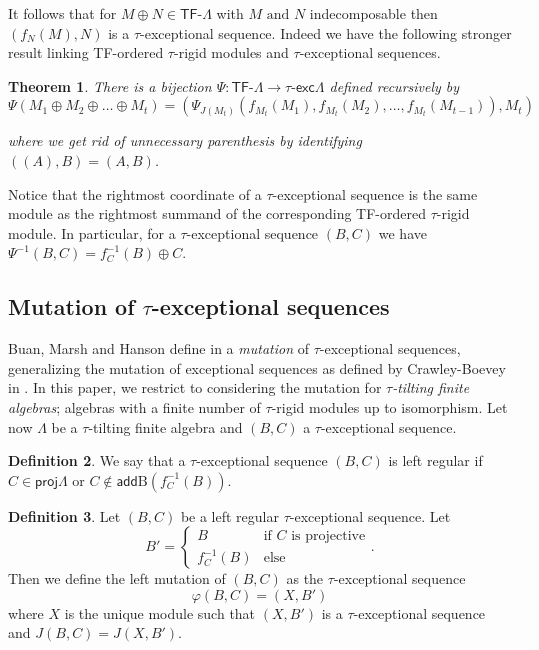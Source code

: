 \documentclass[11pt]{amsart}
\newcommand{\add}{\mathsf{add}}
\newcommand{\proj}{\mathsf{proj}}
\newcommand{\bcomp}{\mathrm{B}}
\newcommand{\tauexc}[1]{\ensuremath{\tau\text{-}\mathsf{exc} #1}}
\newcommand{\tfo}[1]{\ensuremath{\mathsf{TF}\text{-} #1}}
\newtheorem{theorem}{Theorem}[section]
\theoremstyle{definition}
\newtheorem{definition}[theorem]{Definition}
\begin{document}
It follows that for $M \oplus N \in \tfo{\Lambda}$ with $M \text{ and }N$ indecomposable then $(f_N(M),N)$ is a $\tau$-exceptional sequence. Indeed we have the following stronger result linking TF-ordered $\tau$-rigid modules and $\tau$-exceptional sequences.

\begin{theorem}\cite[Thm. 5.1]{mendozatreffinger_stratifyingsystems}\cite[Thm. 5.4]{tauexceptional_buanmarsh}\label{thm:MendozaTreffinger}
    There is a bijection $\Psi\colon \tfo{\Lambda} \to \tauexc{\Lambda}$ defined recursively by \[\Psi(M_1 \oplus M_2 \oplus \dots \oplus M_t) = (\Psi_{J(M_t)}(f_{M_t}(M_1),f_{M_t}(M_2),\dots,f_{M_t}(M_{t-1})),M_t)\]
    
    where we get rid of unnecessary parenthesis by identifying $((A),B) = (A,B)$.
\end{theorem}

Notice that the rightmost coordinate of a $\tau$-exceptional sequence is the same module as the rightmost summand of the corresponding TF-ordered $\tau$-rigid module. In particular, for a $\tau$-exceptional sequence $(B,C)$ we have $\Psi^{-1}(B,C) = f^{-1}_C(B) \oplus C$.
    

\subsection{Mutation of $\tau$-exceptional sequences}
Buan, Marsh and Hanson define in \cite{BHM2024} a \textit{mutation} of $\tau$-exceptional sequences, generalizing the mutation of exceptional sequences as defined by Crawley-Boevey in \cite{cbw92}. In this paper, we restrict to considering the mutation for \textit{$\tau$-tilting finite algebras}; algebras with a finite number of $\tau$-rigid modules up to isomorphism. Let now $\Lambda$ be a $\tau$-tilting finite algebra and $(B,C)$ a $\tau$-exceptional sequence. 

\begin{definition}\cite[Def. 3.11a]{BHM2024}
    We say that a $\tau$-exceptional sequence $(B,C)$ is left regular if $C \in \proj \Lambda$ or $C \notin \add \bcomp(f^{-1}_C(B))$.
\end{definition}

\begin{definition}\cite[Def.-Prop. 4.3]{BHM2024}\label{def:regular_mutation}
    Let $(B,C)$ be a left regular $\tau$-exceptional sequence. Let \[B' = \begin{cases}
        B & \text{if $C$ is projective} \\
        f^{-1}_C(B) & \text{else}
    \end{cases}.\] Then we define the left mutation of $(B,C)$ as the $\tau$-exceptional sequence \[\varphi(B,C) = (X,B')\] where $X$ is the unique module such that $(X,B')$ is a $\tau$-exceptional sequence and $J(B,C) = J(X,B')$.
\end{definition}
\end{document}
